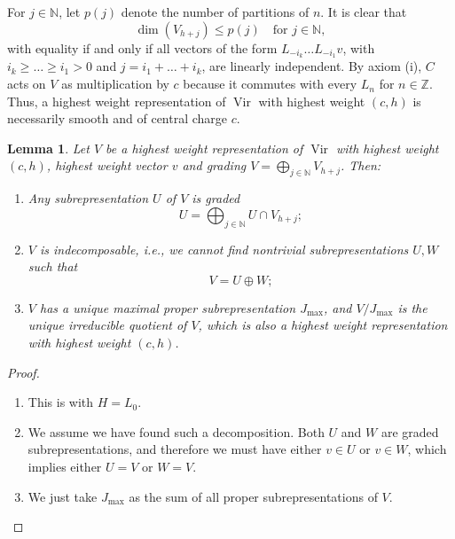 \documentclass[a4paper, 12pt, reqno]{amsart}
\newtheorem{lemma}[theorem]{Lemma}
\theoremstyle{remark}
\DeclareMathOperator{\Vir}{Vir}
\begin{document}
For $j \in \mathbb{N}$, let $p(j)$ denote the number of partitions of $n$.
It is clear that
\begin{equation}
  \label{eq:36}
  \dim(V_{h + j}) \le p(j) \quad \text{for $j \in \mathbb{N}$},
\end{equation}
with equality if and only if all vectors of the form $L_{-i_k}\dots L_{-i_1}v$, with $i_k \ge \dots \ge i_1 > 0$ and $j = i_1 + \dots + i_k$, are linearly independent.
By axiom (i), $C$ acts on $V$ as multiplication by $c$ because it commutes with every $L_n$ for $n \in \mathbb{Z}$.
Thus, a highest weight representation of $\Vir$ with highest weight $(c, h)$ is necessarily smooth and of central charge $c$.

\begin{lemma}
  \label{lmm:18}
  Let $V$ be a highest weight representation of $\Vir$ with highest weight $(c, h)$, highest weight vector $v$ and grading $V = \bigoplus_{j \in \mathbb{N}}V_{h + j}$.
  Then:
  \begin{enumerate}
  \item Any subrepresentation $U$ of $V$ is graded
    \begin{equation*}
      U = \bigoplus_{j \in \mathbb{N}}U \cap V_{h + j};
    \end{equation*}
  \item $V$ is indecomposable, i.e., we cannot find nontrivial subrepresentations $U, W$ such that
    \begin{equation*}
      V = U \oplus W;
    \end{equation*}
  \item $V$ has a unique maximal proper subrepresentation $J_{\max}$, and $V/J_{\max}$ is the unique irreducible quotient of $V$, which is also a highest weight representation with highest weight $(c, h)$.
  \end{enumerate}
\end{lemma}

\begin{proof}\leavevmode
  \begin{enumerate}
  \item This is  with $H = L_0$.
  \item We assume we have found such a decomposition.
    Both $U$ and $W$ are graded subrepresentations, and therefore we must have either $v \in U$ or $v \in W$, which implies either $U = V$ or $W = V$.
  \item We just take $J_{\max}$ as the sum of all proper subrepresentations of $V$. \qedhere
  \end{enumerate}
\end{proof}
\end{document}
